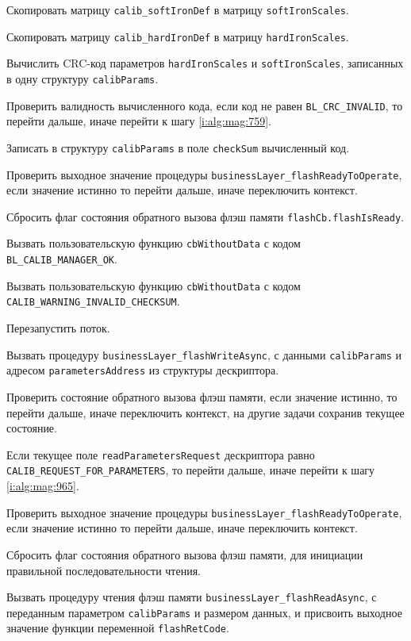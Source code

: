 \begin{enumerate_step}
    \item Скопировать матрицу \lstinline|calib_softIronDef| в матрицу \lstinline|softIronScales|.
    \item Скопировать матрицу \lstinline|calib_hardIronDef| в матрицу \lstinline|hardIronScales|.
    \item Вычислить CRC-код параметров \lstinline|hardIronScales| и \lstinline|softIronScales|, записанных в одну структуру \lstinline|calibParams|.
    \item Проверить валидность вычисленного кода, если код не равен \lstinline|BL_CRC_INVALID|, то перейти дальше, иначе перейти к шагу \ref{i:alg:mag:759}.
    \item Записать в структуру \lstinline|calibParams| в поле \lstinline|checkSum| вычисленный код.
    \item Проверить выходное значение процедуры \lstinline|businessLayer_flashReadyToOperate|, если значение истинно то перейти дальше, иначе переключить контекст.
    \item Сбросить флаг состояния обратного вызова флэш памяти \lstinline|flashCb.flashIsReady|.
    \item Вызвать пользовательскую функцию \lstinline|cbWithoutData| с кодом \lstinline|BL_CALIB_MANAGER_OK|.
    \item \label{i:alg:mag:759} Вызвать пользовательскую функцию \lstinline|cbWithoutData| с кодом \lstinline|CALIB_WARNING_INVALID_CHECKSUM|.
    \item Перезапустить поток.
    \item Вызвать процедуру \lstinline|businessLayer_flashWriteAsync|, с данными \lstinline|calibParams| и адресом \lstinline|parametersAddress| из структуры дескриптора.
    \item Проверить состояние обратного вызова флэш памяти, если значение истинно, то перейти дальше, иначе переключить контекст, на другие задачи сохранив текущее состояние.
    \item \label{i:alg:mag:967} Если текущее поле \lstinline|readParametersRequest| дескриптора равно \lstinline|CALIB_REQUEST_FOR_PARAMETERS|, то перейти дальше, иначе перейти к шагу
    \ref{i:alg:mag:965}. 
    \item Проверить выходное значение процедуры \lstinline|businessLayer_flashReadyToOperate|, если значение истинно то перейти дальше, иначе переключить контекст.
    \item Сбросить флаг состояния обратного вызова флэш памяти, для инициации правильной последовательности чтения.
    \item Вызвать процедуру чтения флэш памяти \lstinline|businessLayer_flashReadAsync|, с переданным параметром \lstinline|calibParams| и размером данных, и присвоить выходное значение функции переменной \lstinline|flashRetCode|.

\end{enumerate_step}
